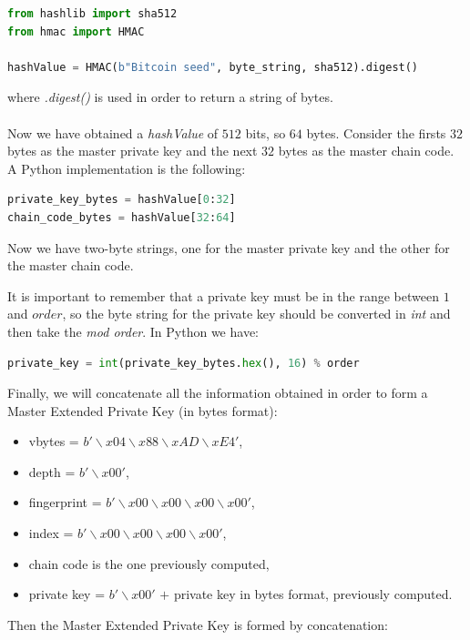 \begin{lstlisting}[language=Python]
from hashlib import sha512
from hmac import HMAC

hashValue = HMAC(b"Bitcoin seed", byte_string, sha512).digest()
\end{lstlisting}
where \textit{.digest()} is used in order to return a string of bytes.
\\ \\
Now we have obtained a \textit{hashValue} of $512$ bits, so $64$ bytes. Consider the firsts $32$ bytes as the master private key and the next $32$ bytes as the master chain code. A Python implementation is the following:

\begin{lstlisting}[language=Python]
private_key_bytes = hashValue[0:32]
chain_code_bytes = hashValue[32:64]
\end{lstlisting}
\begin{flushleft}
	Now we have two-byte strings, one for the master private key and the other for the master chain code.
\end{flushleft}
It is important to remember that a private key must be in the range between $1$ and $order$, so the byte string for the private key should be converted in \textit{int} and then take the \textit{mod order}. In Python we have:

\begin{lstlisting}[language=Python]
private_key = int(private_key_bytes.hex(), 16) % order
\end{lstlisting}
\begin{flushleft}
	Finally, we will concatenate all the information obtained in order to form a Master Extended Private Key (in bytes format):
\end{flushleft}

\begin{itemize}
	\item vbytes = $b'\backslash x04\backslash x88\backslash xAD\backslash xE4'$,
	\item depth = $b'\backslash x00'$,
	\item fingerprint = $b'\backslash x00\backslash x00\backslash x00\backslash x00'$,
	\item index = $b'\backslash x00\backslash x00\backslash x00\backslash x00'$,
	\item chain code is the one previously computed,
	\item private key = $b'\backslash x00'$ $+$ private key in bytes format, previously computed.
\end{itemize}
Then the Master Extended Private Key is formed by concatenation:

